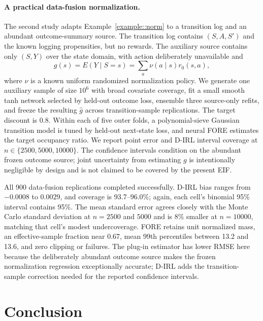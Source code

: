 \documentclass[12pt]{article}
\theoremstyle{plain}
\begin{document}
\paragraph{A practical data-fusion normalization.}
The second study adapts Example~\ref{example::norm} to a transition log and an
abundant outcome-summary source. The transition log contains $(S,A,S')$ and
the known logging propensities, but no rewards. The auxiliary source contains
only $(S,Y)$ over the state domain, with action deliberately unavailable and
\[
g(s)=E(Y\mid S=s)=\sum_a\nu(a\mid s)r_0(s,a),
\]
where $\nu$ is a known uniform randomized normalization policy. We generate one
auxiliary sample of size $10^6$ with broad covariate coverage, fit a small smooth
tanh network selected by held-out outcome loss, ensemble three source-only
refits, and freeze the resulting $\widehat g$ across transition-sample
replications. The target discount is $0.8$. Within each of five outer folds, a
polynomial-sieve Gaussian transition model is tuned by held-out next-state loss,
and neural FORE estimates the target occupancy ratio. We report point error and
D-IRL interval coverage at $n\in\{2500,5000,10000\}$. The confidence intervals
condition on the abundant frozen outcome source; joint uncertainty from
estimating $g$ is intentionally negligible by design and is not claimed to be
covered by the present EIF.


All 900 data-fusion replications completed successfully. D-IRL bias ranges
from $-0.0008$ to $0.0029$, and coverage is 93.7--96.0\%; again, each cell's
binomial 95\% interval contains 95\%. The mean standard error agrees closely
with the Monte Carlo standard deviation at $n=2500$ and $5000$ and is 8\%
smaller at $n=10000$, matching that cell's modest undercoverage. FORE retains
unit normalized mass, an effective-sample fraction near 0.67, mean 99th
percentiles between 13.2 and 13.6, and zero clipping or failures. The plug-in
estimator has lower RMSE here because the deliberately abundant outcome source
makes the frozen normalization regression exceptionally accurate; D-IRL adds
the transition-sample correction needed for the reported confidence intervals.

\section{Conclusion}
\end{document}
